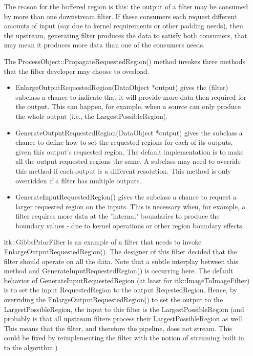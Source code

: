 The reason for the buffered region is this: the output of a filter may be
consumed by more than one downstream filter. If these consumers each request
different amounts of input (say due to kernel requirements or other padding
needs), then the upstream, generating filter produces the data to satisfy
both consumers, that may mean it produces more data than one of the
consumers needs.

The ProcessObject::PropagateRequestedRegion() method invokes three methods
that the filter developer may choose to overload. 

\begin{itemize}
        \item EnlargeOutputRequestedRegion(DataObject *output) gives the
        (filter) subclass a chance to indicate that it will provide more data
        then required for the output. This can happen, for example, when a
        source can only produce the whole output (i.e., the
        LargestPossibleRegion).

        \item GenerateOutputRequestedRegion(DataObject *output) gives the
        subclass a chance to define how to set the requested regions for each
        of its outputs, given this output's requested region.  The default
        implementation is to make all the output requested regions the same.
        A subclass may need to override this method if each output is a
        different resolution. This method is only overridden if a filter has
        multiple outputs.

        \item GenerateInputRequestedRegion() gives the subclass a chance to
        request a larger requested region on the inputs. This is necessary
        when, for example, a filter requires more data at the "internal"
        boundaries to produce the boundary values - due to kernel operations
        or other region boundary effects.
\end{itemize}

itk::GibbsPriorFilter is an example of a filter that needs to invoke
EnlargeOutputRequestedRegion(). The designer of this filter decided that the
filter should operate on all the data. Note that a subtle interplay between
this method and GenerateInputRequestedRegion() is occurring here. The default
behavior of GenerateInputRequestedRegion (at least for
itk::ImageToImageFilter) is to set the input RequestedRegion to the output
ReqestedRegion. Hence, by overriding the EnlargeOutputRequestedRegion() to
set the output to the LargestPossibleRegion, the input to this filter is the
LargestPossibleRegion (and probably is that all upstream filters process
their LargestPossibleRegion as well. This means that the filter, and
therefore the pipeline, does not stream. This could be fixed by
reimplementing the filter with the notion of streaming built in to the
algorithm.)

